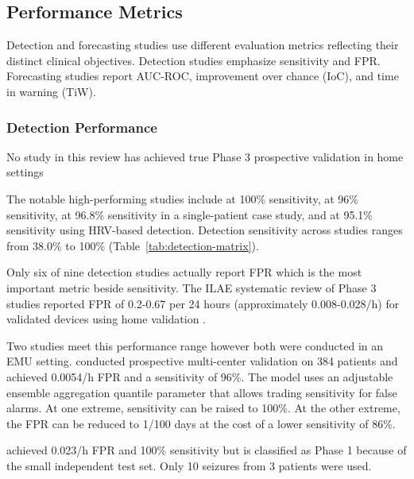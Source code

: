 \subsection{Performance Metrics}

Detection and forecasting studies use different evaluation metrics reflecting their distinct clinical objectives. Detection studies emphasize sensitivity and FPR. Forecasting studies report AUC-ROC, improvement over chance (IoC), and time in warning (TiW).

\subsubsection{Detection Performance}

No study in this review has achieved true Phase 3 prospective validation in home settings

The notable high-performing studies include \textcite{fineDetectionKeyAutomated2025} at 100\% sensitivity, \textcite{spahrDeepLearningbasedDetection2025} at 96\% sensitivity, \textcite{singhrathoreDevelopmentMultimodalMachine2024} at 96.8\% sensitivity in a single-patient case study, and \textcite{elemamAutomatedValidatedTool2025} at 95.1\% sensitivity using HRV-based detection. 
Detection sensitivity across studies ranges from 38.0\% to 100\% (Table~\ref{tab:detection-matrix}). 

Only six of nine detection studies actually report FPR which is the most important metric beside sensitivity. The ILAE systematic review of Phase 3 studies reported FPR of 0.2-0.67 per 24 hours (approximately 0.008-0.028/h) for validated devices using home validation \parencite{beniczkyAutomatedSeizureDetection2021}. 

Two studies meet this performance range however both were conducted in an EMU setting. \textcite{spahrDeepLearningbasedDetection2025} conducted prospective multi-center validation on 384 patients and achieved 0.0054/h FPR and a sensitivity of 96\%. The model uses an adjustable ensemble aggregation quantile parameter that allows trading sensitivity for false alarms. At one extreme, sensitivity can be raised to 100\%. At the other extreme, the FPR can be reduced to 1/100 days at the cost of a lower sensitivity of 86\%. 

\textcite{fineDetectionKeyAutomated2025} achieved 0.023/h FPR and 100\% sensitivity but is classified as Phase 1 because of the small independent test set. Only 10 seizures from 3 patients were used.

